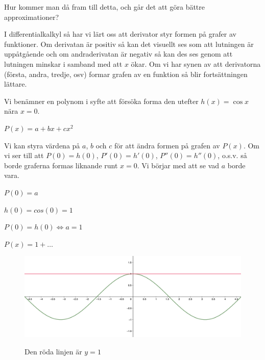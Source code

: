 \documentclass[10pt, a4paper]{amsart}
\begin{document}
Hur kommer man då fram till detta, och går det att göra bättre approximationer?
\bigskip

I differentialkalkyl så har vi lärt oss att derivator styr formen på grafer av funktioner.
Om derivatan är positiv så kan det visuellt ses som att lutningen är uppåtgående och om andraderivatan är negativ så kan des ses genom att lutningen minskar i samband med att $ x $ ökar.
Om vi har synen av att derivatorna (första, andra, tredje, osv) formar grafen av en funktion så blir fortsättningen lättare.
\bigskip

Vi benämner en polynom i syfte att försöka forma den utefter $ h(x) = \cos x $ nära $ x = 0 $.
\vspace{24pt plus 4pt minus 4pt}

\hspace{5ex}
$ P(x) = a + bx + cx^2 $
\vspace{24pt plus 4pt minus 4pt}

Vi kan styra värdena på $ a $, $ b $ och $ c $ för att ändra formen på grafen av $ P(x) $.
Om vi ser till att $ P(0) = h(0) $, $ P'(0) = h'(0) $, $ P''(0) = h''(0) $, o.s.v. så borde graferna formas liknande runt $ x = 0 $.
Vi börjar med att se vad $ a $ borde vara.
\vspace{24pt plus 4pt minus 4pt}

\hspace{5ex}
$ P(0) = a $

\hspace{5ex}
$ h(0) = cos(0) = 1 $
\bigskip

\hspace{5ex}
$ P(0) = h(0) \iff a = 1 $
\bigskip

\hspace{5ex}
$ P(x) = 1 + \dots $

\begin{figure}[ht!]
    \includegraphics[width=\linewidth]{photos/chapter1/2.png}
    \centerline{Den röda linjen är $ y = 1 $}
\end{figure}
\bigskip
\end{document}
